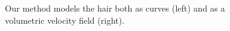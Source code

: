 \begin{figure}[t!]
  \centering {} 
  \caption{\label{fig:viz} Our method models the hair both as curves
    (left) and as a volumetric velocity field (right).}
\end{figure}
%

